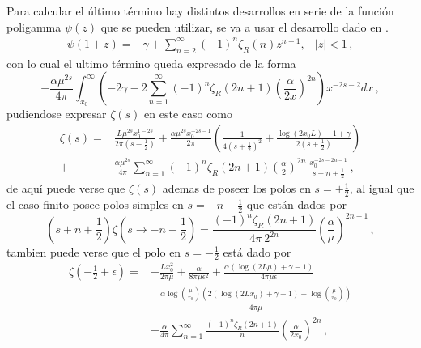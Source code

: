 Para calcular el último término hay distintos desarrollos en serie de la función poligamma $\psi (z)$ que se pueden utilizar, se va a usar el desarrollo dado en \cite{Abramowitz:1974:HMF:1098650}.
\begin{equation}
\begin{array}{cc}
\psi (1+ z ) = - \gamma + \sum \limits_{n=2}^{\infty} (-1) ^n \zeta _R (n) z ^{n-1},  & |z| < 1
\, ,
\end{array}
\label{repr}
\end{equation}
con lo cual el ultimo término queda expresado de la forma
\begin{equation}
- \frac{\alpha \mu ^{2s}}{4 \pi}
\int _{x_0} ^{\infty}
\left(
-2 \gamma -
2 \sum _{n=1} ^{\infty} 
(-1) ^{n}
\zeta _R (2n+1) 
\left( \frac{\alpha}{2 x} \right) ^{2n}
\right)
x ^{-2s-2} dx
\, ,
\end{equation}
pudiendose expresar $\zeta  (s) $ en este caso como
\begin{align}
	\zeta (s)=
&
\nonumber
	\frac{L  \mu ^{2s} x _0 ^{1-2s} }{2 \pi \left( s- \frac{1}{2} \right)}  + 
	\frac{\alpha \mu ^{2s} x _{0} ^{-2s-1} }{2 \pi} 
	\left( 
	\frac{1}{4 \left(s+ \frac{1}{2} \right) ^2} +
	\frac{\log(2 x _0 L) -1 + \gamma}{2 \left(s+\frac{1}{2} \right)} 
	\right) 
\\
+
&	
	\frac{\alpha \mu ^{2s}}{4\pi} 
	\sum _{n=1} ^{\infty} (-1) ^{n} \zeta _R (2n+1) 
	\left( \frac{\alpha}{2 } \right) ^{2n} \ \frac{x _0 ^{-2s-2n-1}}{s+n+ \frac{1}{2}}
	\, ,
\end{align}
de aquí puede verse que $ \zeta (s) $ ademas de poseer los polos en $s = \pm \frac{1}{2}$, al igual que el caso finito posee polos simples en $ s = -n - \frac{1}{2}$ que están dados por
\begin{equation}
	\left( s + n + \frac{1}{2}\right)
	\zeta \left( s \rightarrow -n - \frac{1}{2}\right) =
	\frac{(-1) ^n \zeta _R (2n+1)}{4 \pi \ 2 ^{ 2n } }
	\left( \frac{\alpha}{\mu} \right) ^{2n+1}
	\, ,
\end{equation}
tambien puede verse que el polo en $s = - \frac{1}{2}$ está dado por 
\begin{align}
	\zeta \left(- \frac{1}{2} + \epsilon \right)=
&
\nonumber
	-
	\frac{L x _0 ^2}{2 \pi \mu}+ 
	\frac{\alpha}{8 \pi \mu  \epsilon  ^2} +
	\frac{\alpha \left( \log (2 L \mu ) + \gamma -1  \right)}{4 \pi \mu  \epsilon }
\\
\nonumber
&
+
	\frac{\alpha \log \left( \frac{\mu}{x _0} \right) 	
		\left( 2 (\log ( 2 L x_0) + \gamma -1 ) + \log \left( \frac{\mu}{x _0}\right)  \right) }{4 \pi \mu}
\\
&
+	
	\frac{\alpha }{4\pi} 
	\sum _{n=1} ^{\infty} \frac{(-1) ^{n} \zeta _R (2n+1) }{n}  
	\left( \frac{\alpha}{2 x _0} \right) ^{2n}
\, ,
\end{align}
